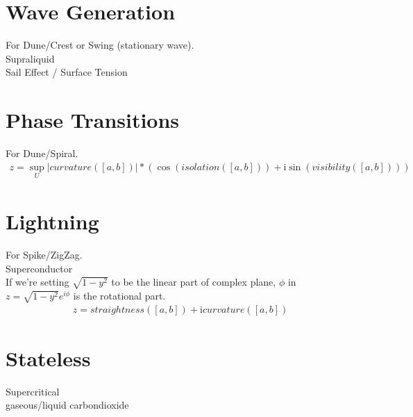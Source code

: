 \documentclass{report}
\begin{document}
\section{Wave Generation}
For Dune/Crest or Swing (stationary wave).\\
Supraliquid\\
Sail Effect / Surface Tension

\section{Phase Transitions}
For Dune/Spiral.
\begin{align}
z =  \sup_{U}\lvert curvature([a,b]) \rvert*(\cos{(isolation([a,b]))} +\mathrm{i} \sin{(visibility([a,b]))})
\end{align}

\section{Lightning}
For Spike/ZigZag.\\
Superconductor\\
If we're setting $\sqrt{1-y^2}$ to be the linear part of complex plane, $\phi$ in $z=\sqrt{1-y^2}e^{i\phi}$ is the rotational part.
\begin{align}
z =  straightness([a,b]) + \mathrm{i} curvature([a,b])
\end{align}

\section{Stateless}
Supercritical\\
gaseous/liquid carbondioxide

\iffalse
\printbibliography
\fi
{}

\end{document}
